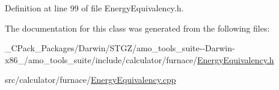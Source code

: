 Definition at line 99 of file Energy\+Equivalency.\+h.



The documentation for this class was generated from the following files\+:\begin{DoxyCompactItemize}
\item 
\+\_\+\+C\+Pack\+\_\+\+Packages/\+Darwin/\+S\+T\+G\+Z/amo\+\_\+tools\+\_\+suite-\/-\/\+Darwin-\/x86\+\_/amo\+\_\+tools\+\_\+suite/include/calculator/furnace/\hyperlink{___c_pack___packages_2_darwin_2_s_t_g_z_2amo__tools__suite--_darwin-x86__64_2amo__tools__suite_22deb35937168994abc5651756c82123a}{Energy\+Equivalency.\+h}\item 
src/calculator/furnace/\hyperlink{_energy_equivalency_8cpp}{Energy\+Equivalency.\+cpp}\end{DoxyCompactItemize}
